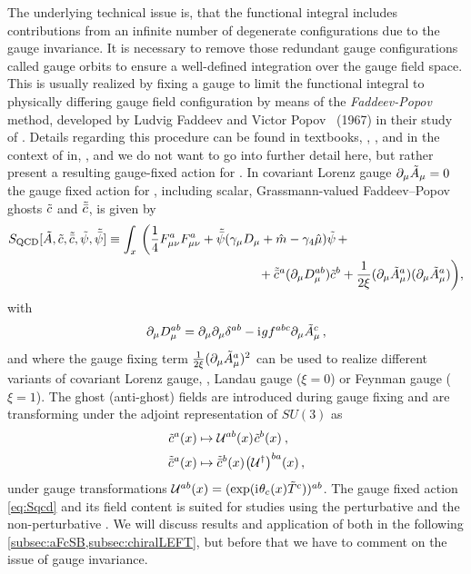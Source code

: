 The underlying technical issue is, that the functional integral includes contributions from an infinite number of degenerate configurations due to the gauge invariance.
It is necessary to remove those redundant gauge configurations \dash{} called gauge orbits \dash{} to ensure a well-defined integration over the gauge field space.
This is usually realized by fixing a gauge to limit the functional integral to physically differing gauge field configuration by means of the \textit{Faddeev-Popov} method, developed by Ludvig Faddeev and Victor Popov~\cite{Faddeev1967Jul} (1967) in their study of \ymts{}.
Details regarding this procedure can be found in textbooks, \eg{}, , and in the context of \frg{} in, \eg{},  and we do not want to go into further detail here, but rather present a resulting gauge-fixed action for \qcd{}.
In covariant Lorenz gauge $\partial_\mu \tilde{A}_\mu=0$ the gauge fixed action for \qcd{}, including scalar, Grassmann-valued Faddeev–Popov ghosts $\tilde{c}$ and $\tilde{\bar{c}}$, is given by
\begin{align}
S_\mathrm{QCD}[\FA,\Fc,\Fcb,\Fpsi,\Fpsib]&\equiv \int_x\, \bigg(
\frac{1}{4} F_{\mu\nu}^a F_{\mu\nu}^a
+\Fpsib(\gamma_\mu D_\mu +\hat{m}- \gamma_4 \hat{\mu})\Fpsi\,+\notag\\* %
&\qquad\qquad\qquad\qquad\qquad\qquad+\Fcb\mkern0.5mu{}^a(\partial_\mu D_\mu^{ab})\Fc^b
+\frac{1}{2\xi} (\partial_\mu \FA_\mu^a)(\partial_\mu \FA_\mu^a)
\bigg ) ,
\label{eq:Sqcd}
\end{align}
with
\begin{align}
\partial_\mu D_\mu^{ab}=\partial_\mu \partial_\mu \delta^{ab} - \mathrm{i}\mkern1mu g f^{abc} \partial_\mu \tilde{A}_\mu^c\, ,
\label{eq:dmudFP}
\end{align}
and where the gauge fixing term ${\tfrac{1}{2\xi}(\partial_\mu \tilde{A}_\mu^a)^2}$ can be used to realize different variants of covariant Lorenz gauge, \eg{}, Landau gauge ($\xi=0$) or Feynman gauge ($\xi=1$).
The ghost (anti-ghost) fields are introduced during gauge fixing and are transforming under the adjoint representation of $SU(3)$ as
\begin{subequations}\label{eq:cUgauge}
\begin{align}
	\tilde{c}^a(x)&\mapsto \mathcal{U}{}^{ab}(x)\mskip1.0mu{}\tilde{c}^b(x)\mskip1.0mu{}\, ,\\[0.1em]
	\tilde{\bar{c}}\mkern0.5mu{}^a(x)&\mapsto \tilde{\bar{c}}\mkern0.5mu{}^b(x)\mskip1.0mu{}\big(\mathcal{U}{}^{\dagger}\big)^{ba}(x) \, ,
\end{align}
\end{subequations}
under gauge transformations $\mathcal{U}{}^{ab}(x)=(\exp(\mathrm{i}\mkern1mu \theta_c(x)\tilde{T}^{c}))^{ab}$.
The gauge fixed action \eqref{eq:Sqcd} and its field content is suited for studies using the perturbative \rg{} and the non-perturbative \frg{}.
We will discuss results and application of both in the following \cref{subsec:aFcSB,subsec:chiralLEFT}, but before that we have to comment on the issue of gauge invariance.\bigskip

